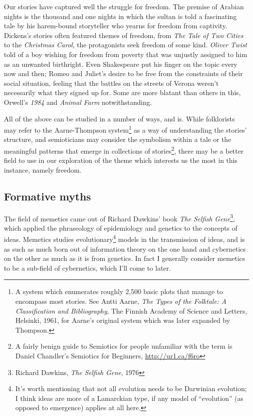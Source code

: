 Our stories have captured well the struggle for freedom. The premise of Arabian
nights is the thousand and one nights in which the sultan is told a fascinating
tale by his harem-bound storyteller who yearns for freedom from captivity.
Dickens's stories often featured themes of freedom, from \textit{The Tale of 
Two Cities} to the \textit{Christmas Carol}, the protagonists seek freedom of
some kind. \textit{Oliver Twist} told of a boy wishing for freedom from poverty
that was unjustly assigned to him as an unwanted birthright. Even Shakespeare
put his f\hbox{}inger on the topic every now and then; Romeo and Juliet's 
desire to be free from the constraints of their social situation, feeling that
the battles on the streets of Verona weren't necessarily what they signed up
for.  Some are more blatant than others in this, Orwell's \textit{1984} and
\textit{Animal Farm} notwithstanding.

All of the above can be studied in a number of ways, and is. While folklorists
may refer to the Aarne-Thompson system\footnote{A system which enumerates
roughly 2,500 basic plots that manage to encompass most stories. See Antti
Aarne, \textit{The Types of the Folktale: A Classif\hbox{}ication and
Bibliography}, The F\hbox{}innish Academy of Science and Letters, Helsinki,
1961, for Aarne's original system which was later expanded by Thompson.} as a
way of understanding the stories' structure, and semioticians may consider the
symbolism within a tale or the meaningful patterns that emerge in collections 
of stories\footnote{A fairly benign guide to Semiotics for people unfamiliar
with the term is Daniel Chandler's Semiotics for Beginners,
\url{http://ur1.ca/f6ro}}, there may be a better f\hbox{}ield to use in our
exploration of the theme which interests us the most in this instance, namely
freedom.


\subsection{Formative myths}
\label{s:artificial_scarcity:unspoken_mythology:formative_myths}

The f\hbox{}ield of memetics came out of Richard Dawkins' book \textit{The
Self\hbox{}ish Gene}\footnote{Richard Dawkins, \textit{The Self\hbox{}ish 
Gene}, 1976}, which applied the phraseology of epidemiology and genetics to the
concepts of ideas.  Memetics studies evolutionary\footnote{It's worth 
mentioning that not all evolution needs to be Darwinian evolution; I think 
ideas are more of a Lamarckian type, if any model of ``evolution'' (as opposed
to emergence) applies at all here.} models in the transmission of ideas, and is
as such as much born out of information theory on the one hand and cybernetics
on the other as much as it is from genetics. In fact I generally consider
memetics to be a sub-f\hbox{}ield of cybernetics, which I'll come to later.

